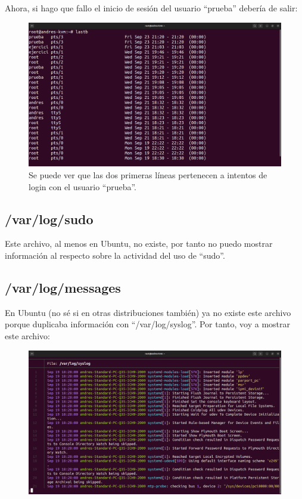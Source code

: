 \documentclass{article}
\begin{document}
Ahora, si hago que fallo el inicio de sesión del usuario ``prueba'' debería de salir:

\begin{figure}[H]
    \includegraphics[width=\textwidth]{imagenes/lastbpruebafirst.png}
    \caption{Se puede ver que las dos primeras líneas pertenecen a intentos de login con el usuario ``prueba''.}
\end{figure}

\subsection*{/var/log/sudo}
Este archivo, al menos en Ubuntu, no existe, por tanto no puedo mostrar información al respecto sobre la actividad del uso de ``sudo''.

\subsection*{/var/log/messages}
En Ubuntu (no sé si en otras distribuciones también) ya no existe este archivo porque duplicaba información con ``/var/log/syslog''. Por tanto, voy a mostrar este archivo:

\begin{figure}[H]
    \includegraphics[width=\textwidth]{imagenes/syslog.png}
\end{figure}
\end{document}
